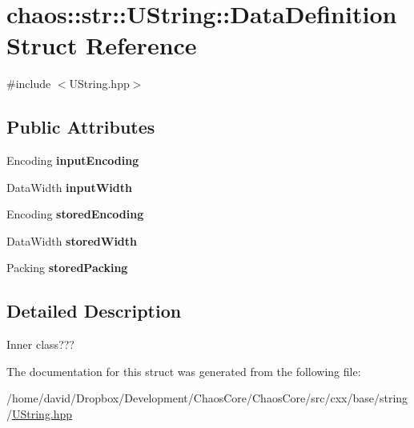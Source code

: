\hypertarget{structchaos_1_1str_1_1_u_string_1_1_data_definition}{\section{chaos\-:\-:str\-:\-:U\-String\-:\-:Data\-Definition Struct Reference}
\label{structchaos_1_1str_1_1_u_string_1_1_data_definition}
}


{\ttfamily \#include $<$U\-String.\-hpp$>$}

\subsection*{Public Attributes}
\begin{DoxyCompactItemize}
\item 
\hypertarget{structchaos_1_1str_1_1_u_string_1_1_data_definition_a2f920e8c20c0c6e0a0a473e9772d99e1}{Encoding {\bfseries input\-Encoding}}\label{structchaos_1_1str_1_1_u_string_1_1_data_definition_a2f920e8c20c0c6e0a0a473e9772d99e1}

\item 
\hypertarget{structchaos_1_1str_1_1_u_string_1_1_data_definition_ad8799df92d7d3ec4668675d918654df8}{Data\-Width {\bfseries input\-Width}}\label{structchaos_1_1str_1_1_u_string_1_1_data_definition_ad8799df92d7d3ec4668675d918654df8}

\item 
\hypertarget{structchaos_1_1str_1_1_u_string_1_1_data_definition_affc7bf4241c9d762501b8273e7c5536d}{Encoding {\bfseries stored\-Encoding}}\label{structchaos_1_1str_1_1_u_string_1_1_data_definition_affc7bf4241c9d762501b8273e7c5536d}

\item 
\hypertarget{structchaos_1_1str_1_1_u_string_1_1_data_definition_a855be951b027222612bb3b5532fef4e4}{Data\-Width {\bfseries stored\-Width}}\label{structchaos_1_1str_1_1_u_string_1_1_data_definition_a855be951b027222612bb3b5532fef4e4}

\item 
\hypertarget{structchaos_1_1str_1_1_u_string_1_1_data_definition_acdc0f7cef212180b4a3b6180bdd3b1bb}{Packing {\bfseries stored\-Packing}}\label{structchaos_1_1str_1_1_u_string_1_1_data_definition_acdc0f7cef212180b4a3b6180bdd3b1bb}

\end{DoxyCompactItemize}


\subsection{Detailed Description}
Inner class??? 

The documentation for this struct was generated from the following file\-:\begin{DoxyCompactItemize}
\item 
/home/david/\-Dropbox/\-Development/\-Chaos\-Core/\-Chaos\-Core/src/cxx/base/string/\hyperlink{_u_string_8hpp}{U\-String.\-hpp}\end{DoxyCompactItemize}
